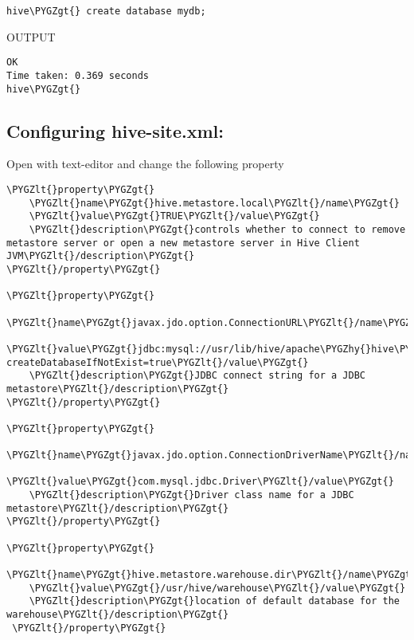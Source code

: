 \documentclass[letterpaper,10pt,english]{sphinxmanual}
\def\PYGZus{\char`\_}
\def\PYGZlt{\char`\<}
\def\PYGZgt{\char`\>}
\def\PYGZhy{\char`\-}
\begin{document}
\begin{Verbatim}[commandchars=\\\{\}]
hive\PYGZgt{} create database mydb;
\end{Verbatim}

OUTPUT

\begin{Verbatim}[commandchars=\\\{\}]
OK
Time taken: 0.369 seconds
hive\PYGZgt{}
\end{Verbatim}


\subsection{Configuring hive-site.xml:}
\label{hive:configuring-hive-site-xml}
Open with text-editor and change the following property

\begin{Verbatim}[commandchars=\\\{\}]
\PYGZlt{}property\PYGZgt{}
    \PYGZlt{}name\PYGZgt{}hive.metastore.local\PYGZlt{}/name\PYGZgt{}
    \PYGZlt{}value\PYGZgt{}TRUE\PYGZlt{}/value\PYGZgt{}
    \PYGZlt{}description\PYGZgt{}controls whether to connect to remove metastore server or open a new metastore server in Hive Client JVM\PYGZlt{}/description\PYGZgt{}
\PYGZlt{}/property\PYGZgt{}

\PYGZlt{}property\PYGZgt{}
    \PYGZlt{}name\PYGZgt{}javax.jdo.option.ConnectionURL\PYGZlt{}/name\PYGZgt{}
    \PYGZlt{}value\PYGZgt{}jdbc:mysql://usr/lib/hive/apache\PYGZhy{}hive\PYGZhy{}0.13.0\PYGZhy{}bin/metastore\PYGZus{}db? createDatabaseIfNotExist=true\PYGZlt{}/value\PYGZgt{}
    \PYGZlt{}description\PYGZgt{}JDBC connect string for a JDBC metastore\PYGZlt{}/description\PYGZgt{}
\PYGZlt{}/property\PYGZgt{}

\PYGZlt{}property\PYGZgt{}
    \PYGZlt{}name\PYGZgt{}javax.jdo.option.ConnectionDriverName\PYGZlt{}/name\PYGZgt{}
    \PYGZlt{}value\PYGZgt{}com.mysql.jdbc.Driver\PYGZlt{}/value\PYGZgt{}
    \PYGZlt{}description\PYGZgt{}Driver class name for a JDBC metastore\PYGZlt{}/description\PYGZgt{}
\PYGZlt{}/property\PYGZgt{}

\PYGZlt{}property\PYGZgt{}
    \PYGZlt{}name\PYGZgt{}hive.metastore.warehouse.dir\PYGZlt{}/name\PYGZgt{}
    \PYGZlt{}value\PYGZgt{}/usr/hive/warehouse\PYGZlt{}/value\PYGZgt{}
    \PYGZlt{}description\PYGZgt{}location of default database for the warehouse\PYGZlt{}/description\PYGZgt{}
 \PYGZlt{}/property\PYGZgt{}
\end{Verbatim}
\end{document}
